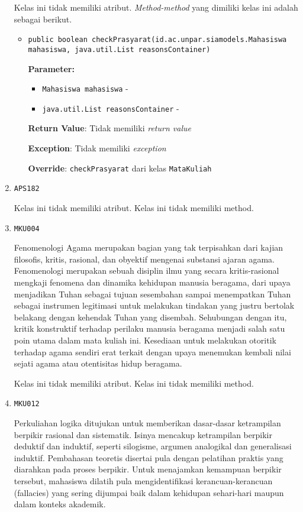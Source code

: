 \documentclass{article}
\begin{document}
\begin{enumerate}
Kelas ini tidak memiliki atribut. \textit{Method-method} yang dimiliki kelas ini adalah sebagai berikut.
\begin{itemize}
\item \texttt{public boolean checkPrasyarat(id.ac.unpar.siamodels.Mahasiswa mahasiswa, java.util.List reasonsContainer)}



\textbf{Parameter:}
\begin{itemize}
\item \texttt{Mahasiswa mahasiswa} - 
\item \texttt{java.util.List reasonsContainer} - 
\end{itemize}
\textbf{Return Value}: Tidak memiliki \textit{return value}

\textbf{Exception}: Tidak memiliki \textit{exception}

\textbf{Override}: \texttt{checkPrasyarat} dari kelas \texttt{MataKuliah}

\end{itemize}
\item \texttt{APS182}



Kelas ini tidak memiliki atribut. Kelas ini tidak memiliki method. \item \texttt{MKU004}

Fenomenologi Agama merupakan bagian yang tak terpisahkan dari kajian filosofis, kritis, 
 rasional, dan obyektif mengenai substansi ajaran agama. Fenomenologi merupakan sebuah 
 disiplin ilmu yang secara kritis-rasional mengkaji fenomena dan dinamika kehidupan manusia 
 beragama, dari upaya menjadikan Tuhan sebagai tujuan sesembahan sampai menempatkan Tuhan 
 sebagai instrumen legitimasi untuk melakukan tindakan yang justru bertolak belakang dengan 
 kehendak Tuhan yang disembah. Sehubungan dengan itu, kritik konstruktif terhadap perilaku 
 manusia beragama menjadi salah satu poin utama dalam mata kuliah ini. Kesediaan untuk 
 melakukan otoritik terhadap agama sendiri erat terkait dengan upaya menemukan kembali nilai
 sejati agama atau otentisitas hidup beragama.

Kelas ini tidak memiliki atribut. Kelas ini tidak memiliki method. \item \texttt{MKU012}

Perkuliahan logika ditujukan untuk memberikan dasar-dasar ketrampilan berpikir rasional dan
 sistematik. Isinya mencakup ketrampilan berpikir deduktif dan induktif, seperti silogisme, 
 argumen analogikal dan generalisasi induktif. Pembahasan teoretis disertai pula dengan
 pelatihan praktis yang diarahkan pada proses berpikir. Untuk menajamkan kemampuan berpikir 
 tersebut, mahasiswa dilatih pula mengidentifikasi kerancuan-kerancuan (fallacies) yang sering 
 dijumpai baik dalam kehidupan sehari-hari maupun dalam konteks akademik.


\end{enumerate}
\end{document}
